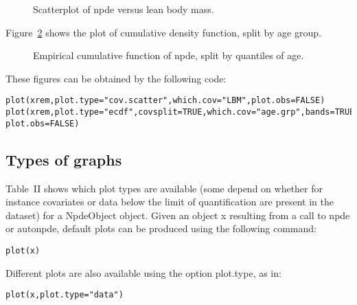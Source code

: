 \begin{figure}[!h]
\par\kern -0.5cm
\begin{center}
\end{center}
\par\kern -0.2cm
\caption{Scatterplot of npde versus lean body mass.}\label{fig:remi.covscatter}
\end{figure}

\newpage
Figure~\ref{fig:remi.covecdf} shows the plot of cumulative density function, split by age group.
\begin{figure}[!h]
\par\kern -0.5cm
\begin{center}
\end{center}
\par\kern -0.2cm
\caption{Empirical cumulative function of npde, split by quantiles of age.} \label{fig:remi.covecdf}
\end{figure}

These figures can be obtained by the following code:
\begin{verbatim}
plot(xrem,plot.type="cov.scatter",which.cov="LBM",plot.obs=FALSE)
plot(xrem,plot.type="ecdf",covsplit=TRUE,which.cov="age.grp",bands=TRUE,
plot.obs=FALSE)
\end{verbatim} 

\subsection{Types of graphs}

\hskip 18pt Table~II shows which plot types are available (some depend on whether for instance covariates or data below the limit of quantification are present in the dataset) for a {\sf NpdeObject} object. Given an object {\sf x} resulting from a call to {\sf npde} or {\sf autonpde}, default plots can be produced using the following command:
\begin{verbatim}
plot(x)
\end{verbatim}
Different plots are also available using the option {\sf plot.type}, as in:
\begin{verbatim}
plot(x,plot.type="data")
\end{verbatim}

